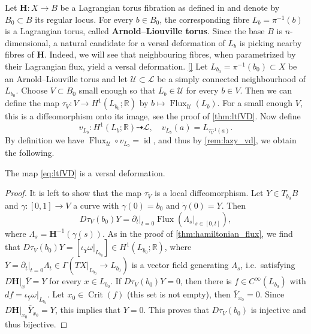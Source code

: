\documentclass[12pt,a4paper,draft]{scrartcl}
\DeclareMathOperator{\id}{id}
\DeclareMathOperator{\Flux}{Flux}
\DeclareMathOperator{\Crit}{Crit}
\begin{document}

Let $\symbf{H} \colon X \rightarrow B$ be a Lagrangian torus fibration as defined in \cite{evans2021atfs} and denote by $B_0 \subset B$ its regular locus. For every $b \in B_0$, the corresponding fibre $L_b = \pi^{-1}(b)$ is a Lagrangian torus, called \textbf{Arnold--Liouville torus}. Since the base $B$ is $n$-dimensional, a natural candidate for a versal deformation of $L_b$ is picking nearby fibres of $\symbf{H}$. Indeed, we will see that neighbouring fibres, when parametrized by their Lagrangian flux, yield a versal deformation. 
\ref{}
Let $L_{b_0} = \pi^{-1}(b_0) \subset X$ be an Arnold--Liouville torus and let $\mathcal{U} \subset \mathcal{L}$ be a simply connected neighbourhood of $L_{b_0}$. Choose $V \subset B_0$ small enough so that $L_b \in \mathcal{U}$ for every $b \in V$. Then we can define the map $τ_V \colon V \rightarrow H^1(L_{b_0};\mathbb{R})$ by $b \mapsto \Flux_{\mathcal{U}}(L_b)$. For a small enough $V$, this is a diffeomorphism onto its image, see the proof of \cref{thm:ltfVD}. Now define
\begin{equation}
    \label{eq:ltfVD}
    v_{L_b} \colon H^1(L_b;\mathbb{R}) \dashrightarrow \mathcal{L}, \quad
    v_{L_b}(a) = L_{τ_V^{-1}(a)}.
\end{equation}
By definition we have $\Flux_{\mathcal{U}} \circ v_{L_b} = \id$, and thus by \cref{rem:lazy_vd}, we obtain the following. 

\begin{proposition}
    \label{thm:ltfVD}
    The map \eqref{eq:ltfVD} is a versal deformation. 
\end{proposition}

\begin{proof}
    It is left to show that the map $τ_V$ is a local diffeomorphism.
    Let $Y \in T_{b_0}B$ and $\gamma \colon [0,1] \rightarrow V$ a curve with $\gamma(0) = b_0$ and $\dot{\gamma}(0) = Y$.
    Then 
    \[
        \label{eq:Dphi}
        Dτ_V(b_0) Y = \partial_t\vert_{t = 0} \Flux (\Lambda_s\vert_{s \in [0,t]}),
    \]
    where $\Lambda_s = \mathbf{H}^{-1}(\gamma(s))$.
    As in the proof of \cref{thm:hamiltonian_flux}, we find that $Dτ_V(b_0) Y = [\iota_{\overline{Y}}\omega \vert_{L_{b_0}}] \in H^1(L_{b_0};\mathbb{R})$, where $\overline{Y} = \partial_t \vert_{t=0} \Lambda_t \in \Gamma(TX\vert_{L_{b_0}} \rightarrow L_{b_0})$ is a vector field generating $\Lambda_s$, i.e.\ satisfying $D\mathbf{H}\vert_x \overline{Y} = Y$ for every $x \in L_{b_0}$.
    If $Dτ_V(b_0) Y = 0$, then there is $f \in C^{\infty}(L_{b_0})$ with $df = \iota_{\overline{Y}}\omega \vert_{L_{b_0}}$.
    Let $x_0 \in \Crit(f)$ (this set is not empty), then $\overline{Y}_{x_0} = 0$.
    Since $D\mathbf{H} \vert_{x_0} \overline{Y}_{x_0} = Y$, this implies that $Y = 0$.
    This proves that $Dτ_V(b_0)$ is injective and thus bijective. 
\end{proof}
\end{document}
